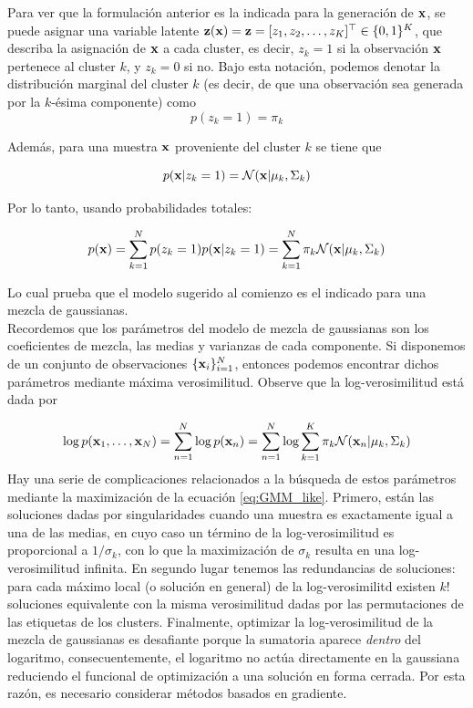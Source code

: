 Para ver que la formulación anterior es la indicada para la generación de $\mathbf{x}$, se puede asignar una variable latente $\mathbf{z}(\mathbf{x}) = \mathbf{z} = [z_1,z_2,\ldots,z_K]^\top\in\{0,1\}^K$, que describa la asignación de $\mathbf{x}$ a cada cluster, es decir, $z_{k}=1$ si la observación $\mathbf{x}$ pertenece al cluster $k$, y $z_{k}=0$ si no. Bajo esta notación, podemos denotar la distribución marginal del cluster $k$ (es decir, de que una observación sea generada por la $k$-ésima componente) como 
\begin{equation}
 	p(z_k=1) = \pi_k \label{eq:GMM_marg1}
\end{equation} 

Además, para una muestra $\mathbf{x}$ proveniente del cluster $k$ se tiene que

\begin{equation}
	p(\mathbf{x}|z_k=1) = {\mathcal N}(\mathbf{x}|\mu_k,\Sigma_k)
\end{equation}

Por lo tanto, usando probabilidades totales:

\begin{equation}
	p(\mathbf{x})=\sum_{k=1}^N p(z_k=1) p(\mathbf{x}|z_k=1) = \sum_{k=1}^N \pi_k {\mathcal N}(\mathbf{x}|\mu_k,\Sigma_k)
\end{equation}

Lo cual prueba que el modelo sugerido al comienzo es el indicado para una mezcla de gaussianas.\\

Recordemos que los parámetros del modelo de mezcla de gaussianas son los coeficientes de mezcla, las medias y varianzas de cada componente. Si disponemos de un conjunto de observaciones $\{\mathbf{x}_i\}_{i=1}^N$, entonces podemos encontrar dichos parámetros mediante máxima verosimilitud. Observe que la log-verosimilitud está dada por 

\begin{equation}
	\log p(\mathbf{x}_1,\ldots,\mathbf{x}_N) = \sum_{n=1}^N \log p(\mathbf{x}_n) = \sum_{n=1}^N \log \sum_{k=1}^K  \pi_k{\mathcal N}(\mathbf{x}_n|\mu_k,\Sigma_k) \label{eq:GMM_like}	
\end{equation}
Hay una serie de complicaciones relacionados a la búsqueda de estos parámetros mediante la maximización de la ecuación \eqref{eq:GMM_like}. Primero, están las soluciones dadas por singularidades cuando una muestra es exactamente igual a una de las medias, en cuyo caso un término de la log-verosimilitud es proporcional a $1/\sigma_k$, con lo que la maximización de $\sigma_k$ resulta en una log-verosimilitud infinita. En segundo lugar tenemos las redundancias de soluciones: para cada máximo local (o solución en general) de la log-verosimilitd existen $k!$ soluciones equivalente con la misma verosimilitud dadas por las permutaciones de las etiquetas de los clusters. Finalmente, optimizar la log-verosimilitud de la mezcla de gaussianas es desafiante porque la sumatoria aparece \emph{dentro} del logaritmo, consecuentemente,  el logaritmo no actúa directamente en la gaussiana reduciendo el funcional de optimización a una solución en forma cerrada. Por esta razón, es necesario considerar métodos basados en gradiente.


